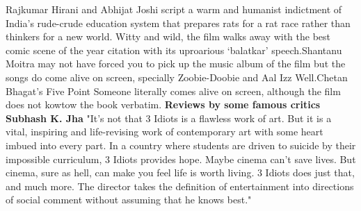 \documentclass[10.5pt, a4paper]{article}
\begin{document}
Rajkumar Hirani and Abhijat Joshi script a warm and humanist indictment of India's rude-crude education system that prepares rats for a rat race rather than thinkers for a new world.
Witty and wild, the film walks away with the best comic scene of the year citation with its uproarious `balatkar' speech.Shantanu Moitra may not have forced you to pick up the music album of the film but the songs do come alive on screen, specially Zoobie-Doobie and Aal Izz Well.Chetan Bhagat's Five Point Someone literally comes alive on screen, although the film does not kowtow the book verbatim.
\textbf{Reviews by some famous critics}\\
\textbf{Subhash K. Jha }
"It's not that 3 Idiots is a flawless work of art. But it is a vital, inspiring and life-revising work of contemporary art with some heart imbued into every part. In a country where students are driven to suicide by their impossible curriculum, 3 Idiots provides hope. Maybe cinema can't save lives. But cinema, sure as hell, can make you feel life is worth living. 3 Idiots does just that, and much more. The director takes the definition of entertainment into directions of social comment without assuming that he knows best."
\begin{figure}
\end{figure}
\end{document}
